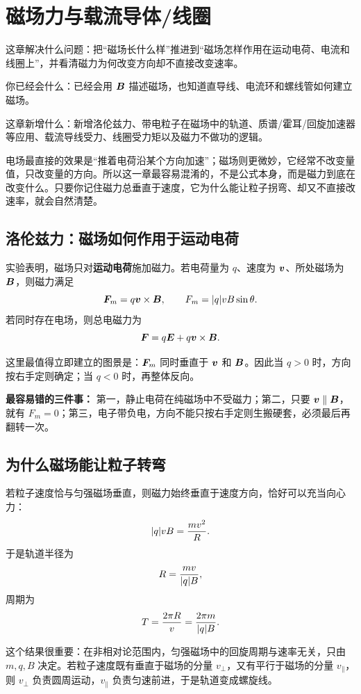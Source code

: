 \documentclass[lang=cn,11pt]{elegantbook}
\newcommand{\bridge}[1]{\begin{note}#1\end{note}}
\newcommand{\chapterroadmap}[3]{%
\begin{introduction}
  \item {\heiti 这章解决什么问题：}#1
  \item {\heiti 你已经会什么：}#2
  \item {\heiti 这章新增什么：}#3
\end{introduction}}
\begin{document}
\chapter{磁场力与载流导体/线圈}

\chapterroadmap
{把“磁场长什么样”推进到“磁场怎样作用在运动电荷、电流和线圈上”，并看清磁力为何改变方向却不直接改变速率。}
{已经会用 \(\vb*{B}\) 描述磁场，也知道直导线、电流环和螺线管如何建立磁场。}
{新增洛伦兹力、带电粒子在磁场中的轨道、质谱/霍耳/回旋加速器等应用、载流导线受力、线圈受力矩以及磁力不做功的逻辑。}

\bridge{电场最直接的效果是“推着电荷沿某个方向加速”；磁场则更微妙，它经常不改变量值，只改变量的方向。所以这一章最容易混淆的，不是公式本身，而是磁力到底在改变什么。只要你记住磁力总垂直于速度，它为什么能让粒子拐弯、却又不直接改速率，就会自然清楚。}

\section{洛伦兹力：磁场如何作用于运动电荷}

实验表明，磁场只对\textbf{运动电荷}施加磁力。若电荷量为 \(q\)、速度为 \(\vb*{v}\)、所处磁场为 \(\vb*{B}\)，则磁力满足
\[
\vb*{F}_m=q\vb*{v}\times \vb*{B},
\qquad
F_m=\abs{q}vB\sin\theta.
\]
若同时存在电场，则总电磁力为
\[
\vb*{F}=q\vb*{E}+q\vb*{v}\times \vb*{B}.
\]

这里最值得立即建立的图景是：\(\vb*{F}_m\) 同时垂直于 \(\vb*{v}\) 和 \(\vb*{B}\)。因此当 \(q>0\) 时，方向按右手定则确定；当 \(q<0\) 时，再整体反向。

\begin{note}
\textbf{最容易错的三件事：} 第一，静止电荷在纯磁场中不受磁力；第二，只要 \(\vb*{v}\parallel\vb*{B}\)，就有 \(F_m=0\)；第三，电子带负电，方向不能只按右手定则生搬硬套，必须最后再翻转一次。
\end{note}

\section{为什么磁场能让粒子转弯}

若粒子速度恰与匀强磁场垂直，则磁力始终垂直于速度方向，恰好可以充当向心力：
\[
\abs{q}vB=\frac{mv^2}{R}.
\]
于是轨道半径为
\[
R=\frac{mv}{\abs{q}B},
\]
周期为
\[
T=\frac{2\pi R}{v}=\frac{2\pi m}{\abs{q}B}.
\]

这个结果很重要：在非相对论范围内，匀强磁场中的回旋周期与速率无关，只由 \(m,q,B\) 决定。若粒子速度既有垂直于磁场的分量 \(v_\perp\)，又有平行于磁场的分量 \(v_\parallel\)，则 \(v_\perp\) 负责圆周运动，\(v_\parallel\) 负责匀速前进，于是轨道变成螺旋线。
\end{document}
